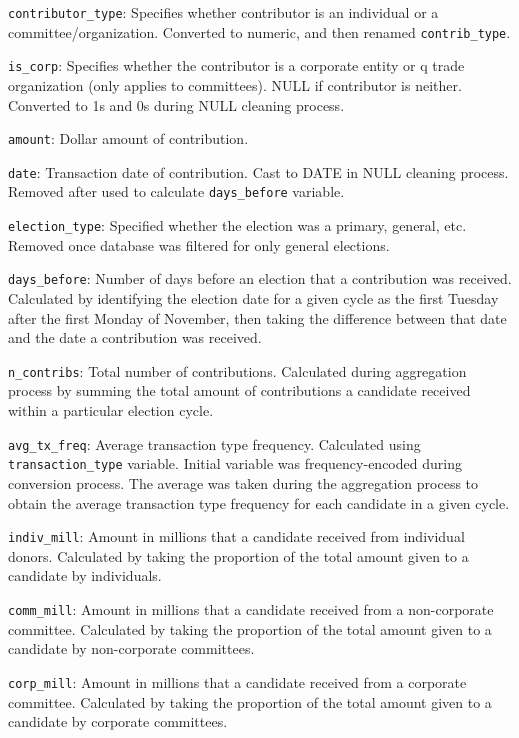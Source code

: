 \texttt{contributor\_type}: Specifies whether contributor is an individual or a committee/organization. Converted to numeric, and then renamed \texttt{contrib\_type}. 

\texttt{is\_corp}: Specifies whether the contributor is a corporate entity or q trade organization (only applies to committees). NULL if contributor is neither. Converted to 1s and 0s during NULL cleaning process.

\texttt{amount}: Dollar amount of contribution.

\texttt{date}: Transaction date of contribution. Cast to DATE in NULL cleaning process. Removed after used to calculate \texttt{days\_before} variable.

\texttt{election\_type}: Specified whether the election was a primary, general, etc. Removed once database was filtered for only general elections.

\texttt{days\_before}: Number of days before an election that a contribution was received. Calculated by identifying the election date for a given cycle as the first Tuesday after the first Monday of November, then taking the difference between that date and the date a contribution was received.

\texttt{n\_contribs}: Total number of contributions. Calculated during aggregation process by summing the total amount of contributions a candidate received within a particular election cycle.

\texttt{avg\_tx\_freq}: Average transaction type frequency. Calculated using \texttt{tran\-sac\-tion\_type} variable. Initial variable was frequency-encoded during conversion process. The average was taken during the aggregation process to obtain the average transaction type frequency for each candidate in a given cycle.

\texttt{indiv\_mill}: Amount in millions that a candidate received from individual donors. Calculated by taking the proportion of the total amount given to a candidate by individuals.

\texttt{comm\_mill}: Amount in millions that a candidate received from a non-corporate committee. Calculated by taking the proportion of the total amount given to a candidate by non-corporate committees.

\texttt{corp\_mill}: Amount in millions that a candidate received from a corporate committee. Calculated by taking the proportion of the total amount given to a candidate by corporate committees.
